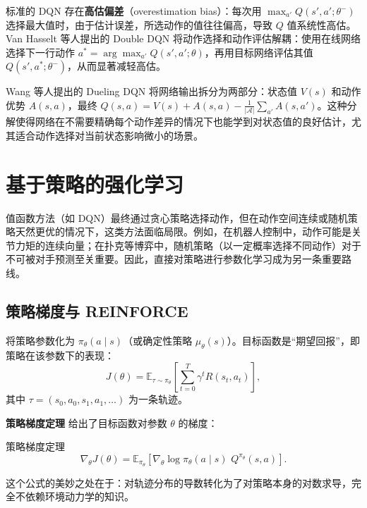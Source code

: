 标准的 DQN 存在\textbf{高估偏差}（overestimation bias）：每次用 $\max_{a'} Q(s',a'; \theta^-)$ 选择最大值时，由于估计误差，所选动作的值往往偏高，导致 $Q$ 值系统性高估。Van Hasselt 等人提出的 Double DQN\cite{vanhasselt2015deepreinforcementlearningdouble} 将动作选择和动作评估解耦：使用在线网络选择下一行动作 $a^* = \arg\max_{a'} Q(s',a'; \theta)$，再用目标网络评估其值 $Q(s', a^*; \theta^-)$，从而显著减轻高估。

Wang 等人提出的 Dueling DQN\cite{wang2016duelingnetworkarchitecturesdeep} 将网络输出拆分为两部分：状态值 $V(s)$ 和动作优势 $A(s,a)$，最终 $Q(s,a) = V(s) + A(s,a) - \frac{1}{|\mathcal{A}|}\sum_{a'} A(s,a')$。这种分解使得网络在不需要精确每个动作差异的情况下也能学到对状态值的良好估计，尤其适合动作选择对当前状态影响微小的场景。

\section{基于策略的强化学习}

值函数方法（如 DQN）最终通过贪心策略选择动作，但在动作空间连续或随机策略天然更优的情况下，这类方法面临局限。例如，在机器人控制中，动作可能是关节力矩的连续向量；在扑克等博弈中，随机策略（以一定概率选择不同动作）对于不可被对手预测至关重要。因此，直接对策略进行参数化学习成为另一条重要路线。

\subsection{策略梯度与 REINFORCE}

将策略参数化为 $\pi_\theta(a \mid s)$（或确定性策略 $\mu_\theta(s)$）。目标函数是“期望回报”，即策略在该参数下的表现：
\begin{equation}\label{eq:policy_objective}
J(\theta) = \mathbb{E}_{\tau \sim \pi_\theta}\left[ \sum_{t=0}^{T} \gamma^t R(s_t, a_t) \right],
\end{equation}
其中 $\tau = (s_0, a_0, s_1, a_1, \dots)$ 为一条轨迹。

\textbf{策略梯度定理}\cite{1999Policy,1992Simple} 给出了目标函数对参数 $\theta$ 的梯度：
\begin{theorem}{策略梯度定理}{}
\begin{equation}\label{eq:policy_gradient}
\nabla_\theta J(\theta) = \mathbb{E}_{\pi_\theta}\left[ \nabla_\theta \log \pi_\theta(a \mid s) \,\, Q^{\pi_\theta}(s, a) \right].
\end{equation}
\end{theorem}
这个公式的美妙之处在于：对轨迹分布的导数转化为了对策略本身的对数求导，完全不依赖环境动力学的知识。

